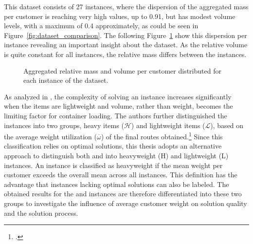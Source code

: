 This dataset consists of 27 instances, where the dispersion of the aggregated mass per customer is reaching very high values, up to
0.91, but has modest volume levels, with a maximum of 0.4 approximately, as could be seen in Figure~\ref{fig:dataset_comparison}. The
following Figure~\ref{fig:aggregated_gendreau_plots} show this dispersion per instance revealing an important insight about the dataset.
As the relative volume is quite constant for all instances, the relative mass differs between the instances.
\begin{figure}[ht]
    \centering
    \caption{Aggregated relative mass and volume per customer distributed for each instance of the \gendreauDataSetText dataset.}
    \label{fig:aggregated_gendreau_plots}
\end{figure}
As analyzed in \cite{tamke_branch-and-cut_2024}, the complexity of solving an instance increases significantly when the items are
lightweight and volume, rather than weight, becomes the limiting factor for container loading. The authors further distinguished
the instances into two groups, heavy items ($\mathcal{H}$) and lightweight items ($\mathcal{L}$), based on the average weight
utilization ($\overline{\omega}$) of the final routes obtained.\footcite[cf.][pp.23–25]{tamke_branch-and-cut_2024}
Since this classification relies on optimal solutions, this thesis adopts an alternative approach to distinguish
both \krebsADataSetText and \gendreauDataSetText into heavyweight (H) and lightweight (L) instances. An instance is classified
as heavyweight if the mean weight per customer exceeds the overall mean across all instances. This definition has the advantage
that instances lacking optimal solutions can also be labeled.
The obtained results for the \gendreauDataSetText and \krebsADataSetText instances are therefore differentiated into these two groups
to investigate the influence of average customer weight on solution quality and the solution process.

